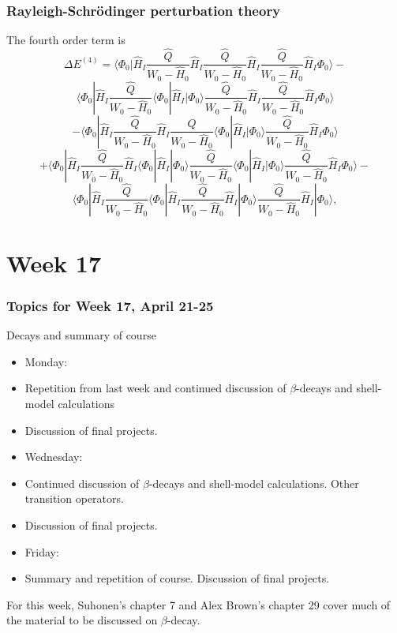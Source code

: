 \documentclass[compress]{beamer}
\begin{document}
\frame
{
\frametitle{Rayleigh-Schr\"odinger perturbation theory}
\begin{small}
{\scriptsize
The fourth order term is
\[
\Delta E^{(4)}=\langle \Phi_0|\hat{H}_I\frac{\hat{Q}}{W_0-\hat{H}_0}\hat{H}_I\frac{\hat{Q}}{W_0-\hat{H}_0}\hat{H}_I\frac{\hat{Q}}{W_0-\hat{H}_0}\hat{H}_I\Phi_0\rangle-\]
\[
\langle \Phi_0|\hat{H}_I\frac{\hat{Q}}{W_0-\hat{H}_0}\langle \Phi_0|\hat{H}_I|\Phi_0\rangle\frac{\hat{Q}}{W_0-\hat{H}_0}\hat{H}_I\frac{\hat{Q}}{W_0-\hat{H}_0}\hat{H}_I\Phi_0\rangle
\]
\[
-\langle \Phi_0|\hat{H}_I\frac{\hat{Q}}{W_0-\hat{H}_0}\hat{H}_I\frac{\hat{Q}}{W_0-\hat{H}_0}\langle \Phi_0|\hat{H}_I|\Phi_0\rangle\frac{\hat{Q}}{W_0-\hat{H}_0}\hat{H}_I\Phi_0\rangle\]
\[
+\langle \Phi_0|\hat{H}_I\frac{\hat{Q}}{W_0-\hat{H}_0}\hat{H}_I\langle \Phi_0|\hat{H}_I|\Phi_0\rangle\frac{\hat{Q}}{W_0-\hat{H}_0}\langle \Phi_0|\hat{H}_I|\Phi_0\rangle\frac{\hat{Q}}{W_0-\hat{H}_0}\hat{H}_I\Phi_0\rangle
-\]
\[
\langle\Phi_0|\hat{H}_I\frac{\hat{Q}}{W_0-\hat{H}_0}\langle\Phi_0|\hat{H}_I\frac{\hat{Q}}{W_0-\hat{H}_0}\hat{H}_I|\Phi_0\rangle  \frac{\hat{Q}}{W_0-\hat{H}_0}\hat{H}_I|\Phi_0\rangle,
\]
}
\end{small}
}


\section[Week 17]{Week 17}
\frame
{
  \frametitle{Topics for Week 17, April 21-25}
  \begin{block}{Decays and summary of course}
\begin{itemize}
\item Monday:
\item Repetition from last week and continued discussion of $\beta$-decays and shell-model calculations
\item Discussion of final projects.
\item Wednesday:
\item Continued discussion of $\beta$-decays and shell-model calculations. Other transition operators.
\item Discussion of final projects.
\item Friday:
\item Summary and repetition  of course. Discussion of final projects.
\end{itemize}
For this week, Suhonen's chapter 7 and Alex Brown's chapter 29 cover much of the material to be discussed on $\beta$-decay. 
  \end{block}
} 
\end{document}
